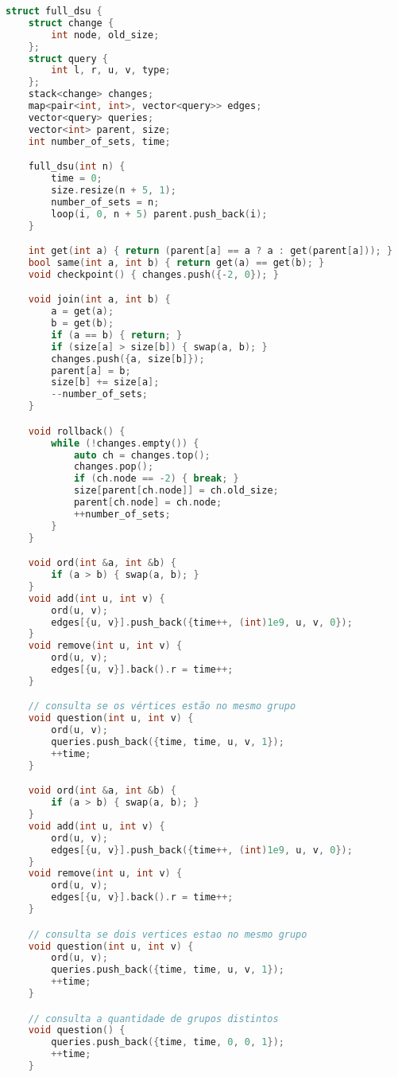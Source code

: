 \documentclass[11pt, a4paper, twoside]{article}
\begin{document}
\begin{lstlisting}[language=C++]
struct full_dsu {
    struct change {
        int node, old_size;
    };
    struct query {
        int l, r, u, v, type;
    };
    stack<change> changes;
    map<pair<int, int>, vector<query>> edges;
    vector<query> queries;
    vector<int> parent, size;
    int number_of_sets, time;

    full_dsu(int n) {
        time = 0;
        size.resize(n + 5, 1);
        number_of_sets = n;
        loop(i, 0, n + 5) parent.push_back(i);
    }

    int get(int a) { return (parent[a] == a ? a : get(parent[a])); }
    bool same(int a, int b) { return get(a) == get(b); }
    void checkpoint() { changes.push({-2, 0}); }

    void join(int a, int b) {
        a = get(a);
        b = get(b);
        if (a == b) { return; }
        if (size[a] > size[b]) { swap(a, b); }
        changes.push({a, size[b]});
        parent[a] = b;
        size[b] += size[a];
        --number_of_sets;
    }

    void rollback() {
        while (!changes.empty()) {
            auto ch = changes.top();
            changes.pop();
            if (ch.node == -2) { break; }
            size[parent[ch.node]] = ch.old_size;
            parent[ch.node] = ch.node;
            ++number_of_sets;
        }
    }

    void ord(int &a, int &b) {
        if (a > b) { swap(a, b); }
    }
    void add(int u, int v) {
        ord(u, v);
        edges[{u, v}].push_back({time++, (int)1e9, u, v, 0});
    }
    void remove(int u, int v) {
        ord(u, v);
        edges[{u, v}].back().r = time++;
    }

    // consulta se os vértices estão no mesmo grupo
    void question(int u, int v) {
        ord(u, v);
        queries.push_back({time, time, u, v, 1});
        ++time;
    }

    void ord(int &a, int &b) {
        if (a > b) { swap(a, b); }
    }
    void add(int u, int v) {
        ord(u, v);
        edges[{u, v}].push_back({time++, (int)1e9, u, v, 0});
    }
    void remove(int u, int v) {
        ord(u, v);
        edges[{u, v}].back().r = time++;
    }

    // consulta se dois vertices estao no mesmo grupo
    void question(int u, int v) {
        ord(u, v);
        queries.push_back({time, time, u, v, 1});
        ++time;
    }

    // consulta a quantidade de grupos distintos
    void question() {
        queries.push_back({time, time, 0, 0, 1});
        ++time;
    }


\end{lstlisting}
\end{document}
